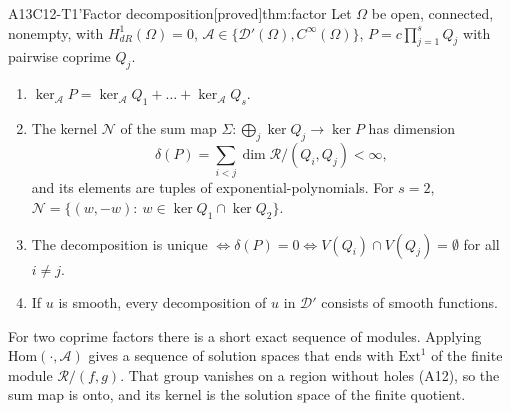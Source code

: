 \documentclass[11pt,a4paper,oneside]{report}
\newcommand{\badge}[2]{\textcolor{#1}{\textsf{\footnotesize[#2]}}}
\newcommand{\proved}{\badge{cC}{proved}}
\newcommand{\ring}{\mathcal{R}}
\newcommand{\Var}{V}
\DeclareMathOperator{\dimc}{dim}
\newenvironment{dimcard}[5]{\par\Needspace{12\baselineskip}\begin{dimcardbox}{#1}{#2}{#3}{#4}{#5}}{\end{dimcardbox}}
\begin{document}
\begin{dimcard}{A13}{C12-T1'}{Factor decomposition}{\proved}{thm:factor}
\label{dim:C12-T1p}%
Let $\Omega$ be open, connected, nonempty, with $H^1_{dR}(\Omega)=0$, $\mathcal A\in\{\mathcal D'(\Omega),C^\infty(\Omega)\}$, $P=c\prod_{j=1}^sQ_j$ with pairwise coprime $Q_j$.
\begin{enumerate}[label=(\roman*)]
\item $\ker_{\mathcal A}P=\ker_{\mathcal A}Q_1+\dots+\ker_{\mathcal A}Q_s$.
\item The kernel $\mathcal N$ of the sum map $\Sigma:\bigoplus_j\ker Q_j\to\ker P$ has dimension
\[
\delta(P)=\sum_{i<j}\dimc\ring/(Q_i,Q_j)<\infty,
\]
and its elements are tuples of exponential-polynomials. For $s=2$, $\mathcal N=\{(w,-w):\ w\in\ker Q_1\cap\ker Q_2\}$.
\item The decomposition is unique $\iff\delta(P)=0\iff\Var(Q_i)\cap\Var(Q_j)=\emptyset$ for all $i\ne j$.
\item If $u$ is smooth, every decomposition of $u$ in $\mathcal D'$ consists of smooth functions.
\end{enumerate}
\end{dimcard}

\begin{proofidea}
For two coprime factors there is a short exact sequence of modules. Applying $\mathrm{Hom}(\cdot,\mathcal A)$ gives a sequence of solution spaces that ends with $\mathrm{Ext}^1$ of the finite module $\ring/(f,g)$. That group vanishes on a region without holes (A12), so the sum map is onto, and its kernel is the solution space of the finite quotient.
\end{proofidea}
\end{document}
